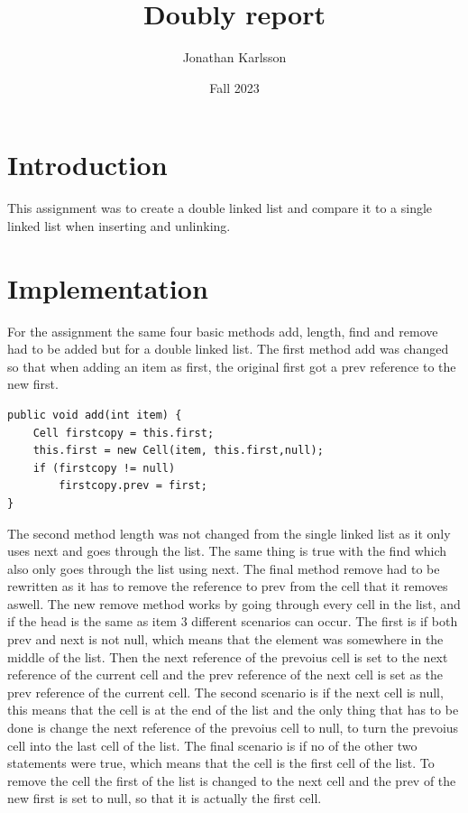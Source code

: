 \documentclass[a4paper,11pt]{article}
\begin{document}
\title{
    \textbf{Doubly report}
}
\author{Jonathan Karlsson}
\date{Fall 2023}

\maketitle

\section*{Introduction}
This assignment was to create a double linked list and compare it to a single linked list when inserting and unlinking.


\section*{Implementation}
For the assignment the same four basic methods add, length, find and remove had to be added but for a double linked list. 
The first method add was changed so that when adding an item as first, the original first got a prev reference to the new first.
\begin{verbatim}
public void add(int item) {
    Cell firstcopy = this.first;
    this.first = new Cell(item, this.first,null);
    if (firstcopy != null)
        firstcopy.prev = first;
}    
\end{verbatim}
The second method length was not changed from the single linked list as it only uses next and goes through the list. 
The same thing is true with the find which also only goes through the list using next. 
\newline
\newline
The final method remove had to be rewritten as it has to remove the reference to prev from the cell that it removes aswell. 
The new remove method works by going through every cell in the list, and if the head is the same as item 3 different scenarios can occur. 
The first is if both prev and next is not null, which means that the element was somewhere in the middle of the list. Then the next reference of the prevoius cell is set to the next reference of the current cell and
the prev reference of the next cell is set as the prev reference of the current cell. 
The second scenario is if the next cell is null, this means that the cell is at the end of the list and the only thing that has to be done is change the next reference of the prevoius cell to null, to turn the prevoius cell into 
the last cell of the list. 
The final scenario is if no of the other two statements were true, which means that the cell is the first cell of the list. To remove the cell the first of the list is changed to the next cell and the prev of the new first is set to null, 
so that it is actually the first cell.
\end{document}
